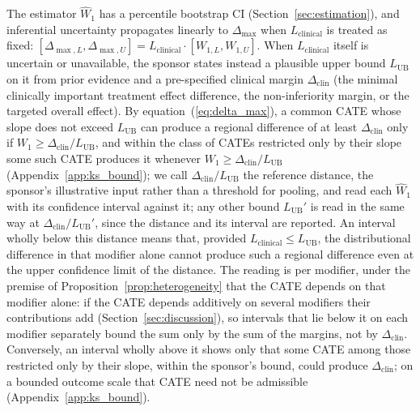 \documentclass[AMA,Times1COL]{WileyNJDv5}
\begin{document}
The estimator $\widehat{W}_1$ has a percentile bootstrap CI (Section~\ref{sec:estimation}), and inferential uncertainty propagates linearly to $\Delta_{\max}$ when $L_{\text{clinical}}$ is treated as fixed: $[\Delta_{\max,L}, \Delta_{\max,U}] = L_{\text{clinical}} \cdot [W_{1,L}, W_{1,U}]$. When $L_{\text{clinical}}$ itself is uncertain or unavailable, the sponsor states instead a plausible upper bound $L_{\text{UB}}$ on it from prior evidence and a pre-specified clinical margin $\Delta_{\text{clin}}$ (the minimal clinically important treatment effect difference, the non-inferiority margin, or the targeted overall effect). By equation~(\ref{eq:delta_max}), a common CATE whose slope does not exceed $L_{\text{UB}}$ can produce a regional difference of at least $\Delta_{\text{clin}}$ only if $W_1 \geq \Delta_{\text{clin}} / L_{\text{UB}}$, and within the class of CATEs restricted only by their slope some such CATE produces it whenever $W_1 \geq \Delta_{\text{clin}} / L_{\text{UB}}$ (Appendix~\ref{app:ks_bound}); we call $\Delta_{\text{clin}} / L_{\text{UB}}$ the reference distance, the sponsor's illustrative input rather than a threshold for pooling, and read each $\widehat{W}_1$ with its confidence interval against it; any other bound $L_{\text{UB}}'$ is read in the same way at $\Delta_{\text{clin}} / L_{\text{UB}}'$, since the distance and its interval are reported. An interval wholly below this distance means that, provided $L_{\text{clinical}} \leq L_{\text{UB}}$, the distributional difference in that modifier alone cannot produce such a regional difference even at the upper confidence limit of the distance. The reading is per modifier, under the premise of Proposition~\ref{prop:heterogeneity} that the CATE depends on that modifier alone: if the CATE depends additively on several modifiers their contributions add (Section~\ref{sec:discussion}), so intervals that lie below it on each modifier separately bound the sum only by the sum of the margins, not by $\Delta_{\text{clin}}$. Conversely, an interval wholly above it shows only that some CATE among those restricted only by their slope, within the sponsor's bound, could produce $\Delta_{\text{clin}}$; on a bounded outcome scale that CATE need not be admissible (Appendix~\ref{app:ks_bound}).
\end{document}
